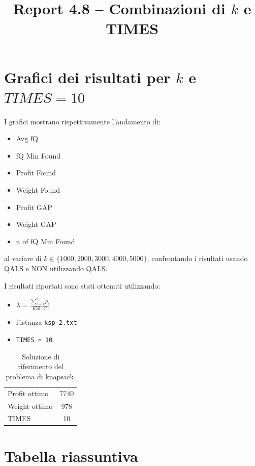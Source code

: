 \documentclass[a4paper,12pt]{article}
\title{Report 4.8 -- Combinazioni di $k$ e TIMES}
\begin{document}
\maketitle

\newpage

\section{Grafici dei risultati per $k$ e $TIMES = 10$}

I grafici mostrano rispettivamente l'andamento di:
\begin{itemize}
    \item Avg fQ
    \item fQ Min Found
    \item Profit Found
    \item Weight Found
    \item Profit GAP
    \item Weight GAP
    \item n of fQ Min Found
\end{itemize}
al variare di $k \in \{1000, 2000, 3000, 4000, 5000\}$, confrontando
i risultati usando QALS e NON utilizzando QALS.

I risultati riportati sono stati ottenuti utilizzando:

\begin{itemize}
    \item $\lambda = \frac{\sum_{i=1}^{n} p_i}{650 \cdot C}$
    \item l'istanza \texttt{ksp\_2.txt}
    \item \texttt{TIMES = 10}
\end{itemize}

\begin{table}[H]
\centering
\begin{tabular}{lc}
\toprule
Profit ottimo & 7740 \\
Weight ottimo & 978 \\
TIMES & 10 \\
\bottomrule
\end{tabular}
\caption{Soluzione di riferimento del problema di knapsack.}
\end{table}

\section{Tabella riassuntiva}
\end{document}
